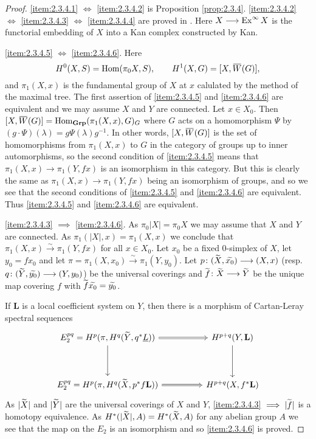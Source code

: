 \documentclass[../main]{subfiles}
\begin{document}
\begin{proof}
    \ref{item:2.3.4.1} $\iff$ \ref{item:2.3.4.2} is Proposition \ref{prop:2.3.4}. \ref{item:2.3.4.2} $\iff$ \ref{item:2.3.4.3} $\iff$ \ref{item:2.3.4.4} are proved in \cite{kan_css_1957-1}. Here $X \longrightarrow \operatorname{Ex}^{\infty}X$ is the functorial embedding of $X$ into a Kan complex constructed by Kan.

    \ref{item:2.3.4.5} $\iff$ \ref{item:2.3.4.6}. Here \[H^{0}(X, S) = \Hom (\pi _{0} X, S),\quad \quad H^{1} (X, G) = [X, \xoverline{W} (G)],\] and $\pi_1 (X, x)$ is the fundamental group of $X$ at $x$ calulated by the method of the maximal tree. The first assertion of \ref{item:2.3.4.5} and \ref{item:2.3.4.6} are equivalent and we may assume $X$ and $Y$ are connected. Let $x \in X_0$. Then $[X, \xoverline{W} (G)] = \Hom_{\mathbf{Grp}} (\pi_1 (X, x), G)_{G}$ where $G$ acts on a homomorphism $\Psi$ by $(g \cdot \Psi) (\lambda) = g \Psi (\lambda) g^{-1}$. In other words, $[X, \xoverline{W} (G)]$ is the set of homomorphisms from $\pi_1 (X,x)$ to $G$ in the category of groups up to inner automorphisms, so the second condition of \ref{item:2.3.4.5} means that $\pi_1 (X, x) \longrightarrow \pi_1 (Y, fx)$ is an isomorphism in this category. But this is clearly the same as $\pi_1 (X, x) \longrightarrow \pi_1 (Y, fx)$ being an isomorphism of groups, and so we see that the second conditions of \ref{item:2.3.4.5} and \ref{item:2.3.4.6} are equivalent. Thus \ref{item:2.3.4.5} and \ref{item:2.3.4.6} are equivalent.

    \ref{item:2.3.4.3} $\implies$ \ref{item:2.3.4.6}. As $\pi_0 |X| = \pi_0 X$ we may assume that $X$ and $Y$ are connected. As $\pi_1 (|X|, x) = \pi_1 (X, x)$ we conclude that $\pi_1 (X, x) \xrightarrow{\sim} \pi_1 (Y, fx)$ for all $x \in X_0$. Let $x_0$ be a fixed 0-simplex of $X$, let $y_0 = f x_0$ and let $\pi = \pi_1 (X, x_0) \xrightarrow{\sim} \pi_1 (Y, y_0)$. Let $p \colon (\xtilde{X}, \xtilde{x_0}) \longrightarrow (X, x)$ (resp. $q \colon (\xtilde{Y}, \xtilde{y_0}) \longrightarrow (Y, y_0)$) be the universal coverings and $\xtilde{f} \colon \xtilde{X} \longrightarrow \xtilde{Y}$ be the unique map covering $f$ with $\xtilde{f} \xtilde{x_0} = \xtilde{y_0}$.

    If $\mathbf{L}$ is a local coefficient system on $Y$, then there is a morphism of Cartan-Leray spectral sequences 
\[\begin{tikzcd}
	{E_2^{pq} = H^p (\pi, H^q(\xtilde{Y}, q^{\ast} \underline{L}))} && {H^{p+q} (Y, \mathbf{L})} \\\\
	{E_2^{pq} = H^p (\pi, H^q(\xtilde{X}, p^{\ast}f \mathbf{L} ))} && {H^{p+q} (X, f^{\ast}\mathbf{L})}
	\arrow[from=1-3, to=3-3]
	\arrow[from=1-1, to=3-1]
	\arrow[Rightarrow, from=3-1, to=3-3]
	\arrow[Rightarrow, from=1-1, to=1-3]
\end{tikzcd}\]
As $|\xtilde{X}|$ and $|\xtilde{Y}|$ are the universal coverings of $X$ and $Y$, \ref{item:2.3.4.3} $\implies |\xtilde{f}|$ is a homotopy equivalence. As $H^{\ast } (|\xtilde{X}|, A) = H^{\ast } (\xtilde{X}, A)$ for any abelian group $A$ we see that the map on the $E_2$ is an isomorphism and so \ref{item:2.3.4.6} is proved.


\end{proof}
\end{document}

